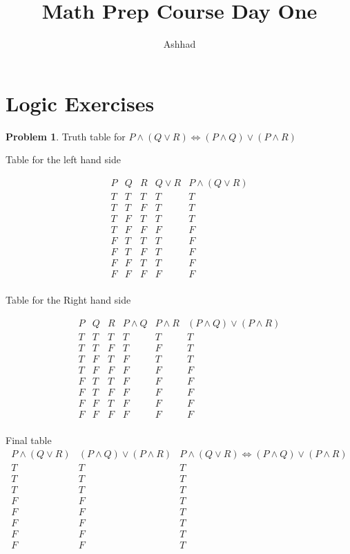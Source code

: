 \documentclass[a4paper]{article}
\title{Math Prep Course Day One}
\author{Ashhad}
\theoremstyle{definition}
\newtheorem{problem}{Problem}[section]
\begin{document}
\maketitle

\section{Logic Exercises}
\begin{problem}
Truth table for \(P \land (Q \lor R) \iff (P \land Q) \lor (P \land R)\)
\end{problem}

Table for the left hand side

\[
\begin{array}{c|c|c|c|c}
P & Q & R & Q \lor R & P \land (Q \lor R) \\
\hline
T & T & T & T & T \\
T & T & F & T & T \\
T & F & T & T & T \\
T & F & F & F & F \\
F & T & T & T & F \\
F & T & F & T & F \\
F & F & T & T & F \\
F & F & F & F & F \\
\end{array}
\]

Table for the Right hand side

\[
\begin{array}{c|c|c|c|c|c}
P & Q & R & P \land Q & P \land R  & (P \land Q) \lor (P \land R) \\
\hline
T & T & T & T & T & T \\
T & T & F & T & F & T \\
T & F & T & F & T & T \\
T & F & F & F & F & F \\
F & T & T & F & F & F \\
F & T & F & F & F & F \\
F & F & T & F & F & F \\
F & F & F & F & F & F \\
\end{array}
\]

Final table
\[
\begin{array}{c|c|c}
P \land (Q \lor R) &(P \land Q) \lor (P \land R) & P \land (Q \lor R) \iff (P \land Q) \lor (P \land R)\\
\hline
T & T & T \\
T & T & T \\
T & T & T \\
F & F & T \\
F & F & T \\
F & F & T \\
F & F & T \\
F & F & T \\
\end{array}
\]
\end{document}
